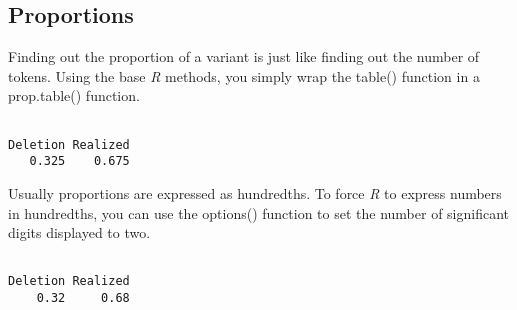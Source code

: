 \documentclass[
  12pt,
  letterpaper]{article}
\newenvironment{Shaded}{\begin{snugshade}}{\end{snugshade}}
\newcommand{\AttributeTok}[1]{\textcolor[rgb]{0.40,0.45,0.13}{#1}}
\newcommand{\CommentTok}[1]{\textcolor[rgb]{0.37,0.37,0.37}{#1}}
\newcommand{\DecValTok}[1]{\textcolor[rgb]{0.68,0.00,0.00}{#1}}
\newcommand{\FunctionTok}[1]{\textcolor[rgb]{0.28,0.35,0.67}{#1}}
\newcommand{\NormalTok}[1]{\textcolor[rgb]{0.00,0.23,0.31}{#1}}
\newcommand{\SpecialCharTok}[1]{\textcolor[rgb]{0.37,0.37,0.37}{#1}}
\renewcommand\texttt[1]{{\ttfamily\color{BrickRed}#1}}
\begin{document}
\hypertarget{proportions}{%
\subsection{Proportions}\label{proportions}}

Finding out the proportion of a variant is just like finding out the
number of tokens. Using the base \emph{R} methods, you simply wrap the
\texttt{table()} function in a \texttt{prop.table()} function.

\begin{Shaded}
\end{Shaded}

\begin{verbatim}

Deletion Realized 
   0.325    0.675 
\end{verbatim}

Usually proportions are expressed as hundredths. To force \emph{R} to
express numbers in hundredths, you can use the \texttt{options()}
function to set the number of significant digits displayed to two.

\begin{Shaded}
\end{Shaded}

\begin{verbatim}

Deletion Realized 
    0.32     0.68 
\end{verbatim}
\end{document}
